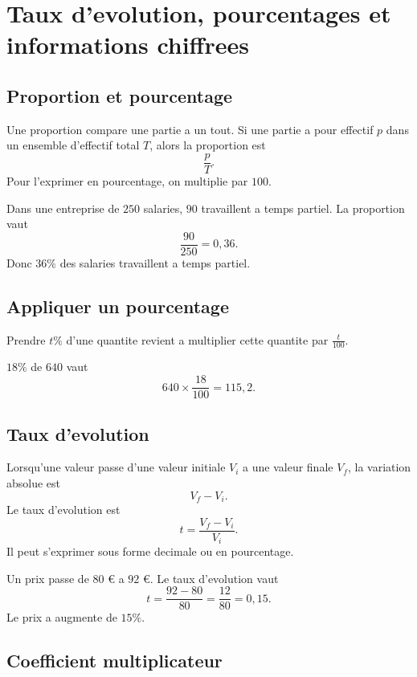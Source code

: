 \documentclass[french,11pt]{book}
\newcommand{\pourcent}{\%}
\begin{document}
\chapter*{Taux d'evolution, pourcentages et informations chiffrees}

\section*{Proportion et pourcentage}

Une proportion compare une partie a un tout. Si une partie a pour effectif $p$ dans un ensemble d'effectif total $T$, alors la proportion est
\[
\frac{p}{T}.
\]
Pour l'exprimer en pourcentage, on multiplie par $100$.

\begin{exemple}
Dans une entreprise de $250$ salaries, $90$ travaillent a temps partiel. La proportion vaut
\[
\frac{90}{250}=0{,}36.
\]
Donc $36\pourcent$ des salaries travaillent a temps partiel.
\end{exemple}

\section*{Appliquer un pourcentage}

Prendre $t\pourcent$ d'une quantite revient a multiplier cette quantite par $\frac{t}{100}$.

\begin{exemple}
$18\pourcent$ de $640$ vaut
\[
640\times\frac{18}{100}=115{,}2.
\]
\end{exemple}

\section*{Taux d'evolution}

Lorsqu'une valeur passe d'une valeur initiale $V_i$ a une valeur finale $V_f$, la variation absolue est
\[
V_f - V_i.
\]
Le taux d'evolution est
\[
t=\frac{V_f - V_i}{V_i}.
\]
Il peut s'exprimer sous forme decimale ou en pourcentage.

\begin{exemple}
Un prix passe de $80$ \euro{} a $92$ \euro{}. Le taux d'evolution vaut
\[
t=\frac{92-80}{80}=\frac{12}{80}=0{,}15.
\]
Le prix a augmente de $15\pourcent$.
\end{exemple}

\section*{Coefficient multiplicateur}
\end{document}
